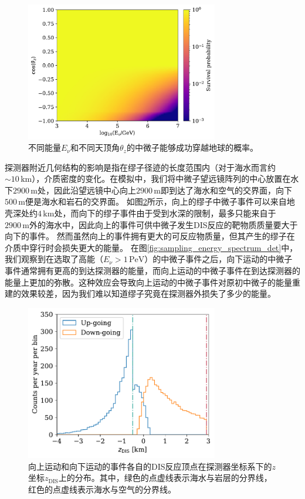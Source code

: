 \begin{figure}[!htb]%
    \centering
    \includegraphics[width=0.75\textwidth]{img/survival_probability.pdf}
    \caption{不同能量$E_\nu$和不同天顶角$\theta_z$的中微子能够成功穿越地球的概率。}
    \label{fig:survival_probability}
\end{figure}

探测器附近几何结构的影响是指在缪子径迹的长度范围内（对于海水而言约$\sim 10\,\mathrm{km}$），介质密度的变化。在模拟中，我们将中微子望远镜阵列的中心放置在水下$2900\,\mathrm{m}$处，因此沿望远镜中心向上$2900\,\mathrm{m}$即到达了海水和空气的交界面，向下$500\,\mathrm{m}$便是海水和岩石的交界面。
如图\ref{fig:sampling_dis_position}所示，向上的缪子中微子事件可以来自地壳深处约$4\,\mathrm{km}$处，而向下的缪子事件由于受到水深的限制，最多只能来自于$2900\,\mathrm{m}$外的海水中，因此向上的事件可供中微子发生DIS反应的靶物质质量要大于向下的事件。
然而虽然向上的事件拥有更大的可反应物质量，但其产生的缪子在介质中穿行时会损失更大的能量。
在图\ref{fig:sampling_energy_spectrum_det}中，我们观察到在选取了高能（$E_\nu > 1\,\mathrm{PeV}$）的中微子事件之后，向下运动的中微子事件通常拥有更高的到达探测器的能量，而向上运动的中微子事件在到达探测器的能量上更加的弥散。这种效应会导致向上运动的中微子事件对原初中微子的能量重建的效果较差，因为我们难以知道缪子究竟在探测器外损失了多少的能量。

\begin{figure}[!htb]%
    \centering
    \includegraphics[width=0.75\textwidth]{img/sampling_dis_position.pdf}
    \caption{向上运动和向下运动的事件各自的DIS反应顶点在探测器坐标系下的$z$坐标$z_\mathrm{DIS}$上的分布。其中，绿色的点虚线表示海水与岩层的分界线，红色的点虚线表示海水与空气的分界线。}
    \label{fig:sampling_dis_position}
\end{figure}


